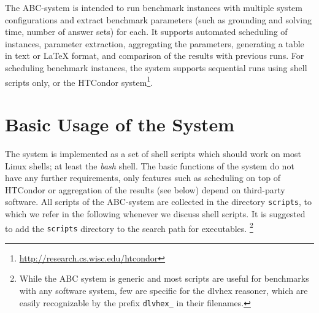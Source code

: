 \documentclass[a4paper]{article}
\newcommand{\dlvhex}{{\sc dlvhex}}
\newcommand{\abcs}{{ABC}}
\begin{document}
		The \abcs-system
		is intended to run benchmark instances with multiple system configurations
		and extract benchmark parameters (such as grounding and solving time, number of answer sets) for each.
		It supports automated scheduling of instances, parameter extraction,
		aggregating the parameters,
		generating a table in text or \LaTeX{} format,
		and comparison of the results with previous runs.
		For scheduling benchmark instances, the system supports sequential runs using shell scripts only,
		or the HTCondor system\footnote{\url{http://research.cs.wisc.edu/htcondor}}.

	\section{Basic Usage of the System}
	\label{sec:usage}

		The system is implemented as a set of shell scripts which should work on most Linux shells; at least the \emph{bash} shell.
		The basic functions of the system do not have any further requirements, only features such as scheduling on top of HTCondor
		or aggregation of the results (see below) depend on third-party software.
		All scripts of the \abcs-system are collected in the directory {\tt scripts},
		to which we refer in the following whenever we discuss shell scripts.
		It is suggested to add the {\tt scripts} directory to the search path for executables.
		\footnote{While the \abcs{} system is generic and most scripts are useful for benchmarks with any software system,
		few are specific for the \dlvhex{} reasoner, which are easily recognizable by the prefix {\tt dlvhex\_} in their filenames.}
\end{document}
